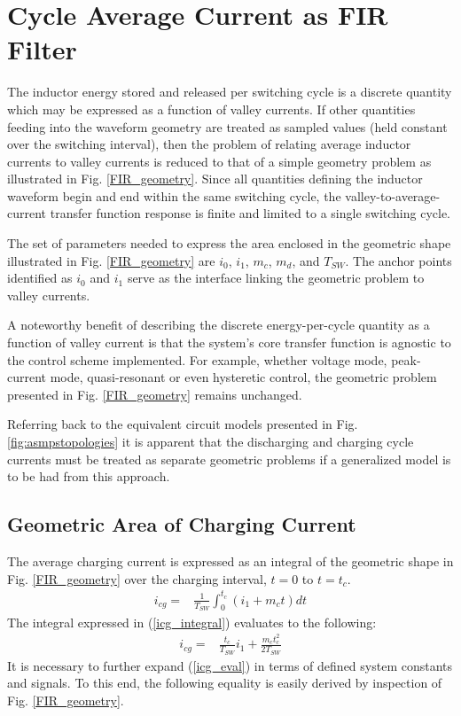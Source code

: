 \documentclass[conference]{IEEEtran}
\begin{document}
\section{Cycle Average Current as FIR Filter}
The inductor energy stored and released per switching cycle is a discrete quantity which may be expressed as a function of valley currents. If other quantities feeding into the waveform geometry are treated as sampled values (held constant over the switching interval), then the problem of relating average inductor currents to valley currents is reduced to that of a simple geometry problem as illustrated in Fig. \ref{FIR_geometry}. Since all quantities defining the inductor waveform begin and end within the same switching cycle, the valley-to-average-current transfer function response is finite and limited to a single switching cycle.

The set of parameters needed to express the area enclosed in the geometric shape illustrated in Fig. \ref{FIR_geometry}  are $i_0$, $i_1$, $m_c$, $m_d$, and $T_{SW}$. The anchor points identified as $i_0$ and $i_1$ serve as the interface linking the geometric problem to valley currents.

A noteworthy benefit of describing the discrete energy-per-cycle quantity as a function of valley current is that the system's core transfer function is agnostic to the control scheme implemented.  For example, whether voltage mode, peak-current mode, quasi-resonant or even hysteretic control, the geometric problem presented in Fig. \ref{FIR_geometry} remains unchanged.

Referring back to the equivalent circuit models presented in Fig. \ref{fig:asmpstopologies} it is apparent that the discharging and charging cycle currents must be treated as separate geometric problems if a generalized model is to be had from this approach.

\subsection{Geometric Area of Charging Current}
The average charging current is expressed as an integral of the geometric shape in Fig. \ref{FIR_geometry} over the charging interval, $t=0$ to $t=t_c$.
\begin{align}
i_{cg} = & \frac{1}{T_{SW}}\int_0^{t_c}(i_1 + m_c t)dt \label{icg_integral}
\end{align}
The integral expressed in (\ref{icg_integral}) evaluates to the following:
\begin{align}
i_{cg} = & \frac{t_c}{T_{SW}} i_1 + \frac{m_ct_c^2}{2T_{SW}} \label{icg_eval}
\end{align}
It is necessary to further expand (\ref{icg_eval}) in terms of defined system constants and signals.  To this end, the following equality is easily derived by inspection of Fig. \ref{FIR_geometry}.
\end{document}
